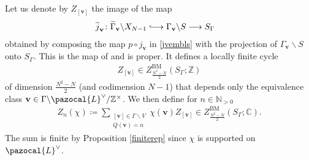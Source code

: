 \documentclass[a4paper,11pt]{amsart} %
\newcommand{\8}{\infty}
\newcommand{\Z}{\mathbb{Z}}
\newcommand{\NN}{\mathbb{N}}
\newcommand{\wud}{\underline{w}}
\newcommand{\vud}{\underline{v}}
\newcommand{\jov}{\overline{j}}
\newcommand{\vbf}{\mathbf{v}}
\newcommand{\SL}{\mathrm{SL}}
\newcommand{\BM}{\mathrm{BM}}
\newcommand{\Gamtil}{\widetilde{\Gamma}}
\newcommand{\HH}{\mathbb{H}}
\newcommand{\R}{\mathbb{R}}
\newcommand{\C}{\mathbb{C}}
\newcommand{\Lcal}{\pazocal{L}}
\newcommand{\hooklongrightarrow}{\lhook\joinrel\longrightarrow}
\theoremstyle{mytheoremstyle}
\theoremstyle{remark}
\newtheorem*{ex}{Example}
\numberwithin{equation}{section}
\begin{document}
Let us denote by $Z_{[\vbf]}$ the image of the map 
\begin{align} \jov_\vbf \colon \Gamtil_\vbf \backslash X_{N-1} & \hooklongrightarrow \Gamma_\vbf \backslash S \longrightarrow S_\Gamma
\end{align}
obtained by composing the map $p \circ j_\vbf$ in \eqref{jvembls} with the projection of $ \Gamma_\vbf \backslash S$ onto $S_\Gamma$. This is the map of \cite[p.~116]{modsymb} and is proper. It defines a locally finite cycle
\begin{align}
    Z_{[\vbf]} \in Z^{\BM}_{\frac{N^2-N}{2}}\left (S_\Gamma ;\Z \right )
\end{align}
of dimension $\frac{N^2-N}{2}$ (and codimension $N-1$) that depends only the equivalence class $\vbf \in \Gamma\backslash  \Lcal^\vee/\Z^\times$. We then define for $n \in \NN_{>0}$
\begin{align}
 Z_n(\chi) \coloneqq \sum_{\substack{[\vbf] \in \Gamma \backslash  V \\ Q(\vbf)=n}} \chi(\vbf)Z_{[\vbf]} \in Z^{\BM}_{\frac{N^2-N}{2}}\left (S_\Gamma ;  \C \right ).
\end{align}
The sum is finite by Proposition \ref{finiterep} since $\chi$ is supported on $\Lcal^\vee$.
\end{document}
